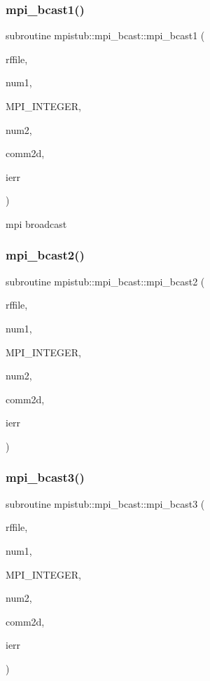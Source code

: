 \subsubsection{\texorpdfstring{mpi\_bcast1()}{mpi\_bcast1()}}
{\footnotesize\ttfamily subroutine mpistub\+::mpi\+\_\+bcast\+::mpi\+\_\+bcast1 (\begin{DoxyParamCaption}\item[{double precision, dimension(\+:)}]{rffile,  }\item[{}]{num1,  }\item[{}]{M\+P\+I\+\_\+\+I\+N\+T\+E\+G\+ER,  }\item[{}]{num2,  }\item[{integer}]{comm2d,  }\item[{}]{ierr }\end{DoxyParamCaption})}



mpi broadcast 

\mbox{\label{interfacempistub_1_1mpi__bcast_aaa0cc632dc25d1d3c5757c751024f9b2}} 
\subsubsection{\texorpdfstring{mpi\_bcast2()}{mpi\_bcast2()}}
{\footnotesize\ttfamily subroutine mpistub\+::mpi\+\_\+bcast\+::mpi\+\_\+bcast2 (\begin{DoxyParamCaption}\item[{double precision}]{rffile,  }\item[{}]{num1,  }\item[{}]{M\+P\+I\+\_\+\+I\+N\+T\+E\+G\+ER,  }\item[{}]{num2,  }\item[{integer}]{comm2d,  }\item[{}]{ierr }\end{DoxyParamCaption})}

\mbox{\label{interfacempistub_1_1mpi__bcast_af37e70cf2f9c41de612305131cd71d92}} 
\subsubsection{\texorpdfstring{mpi\_bcast3()}{mpi\_bcast3()}}
{\footnotesize\ttfamily subroutine mpistub\+::mpi\+\_\+bcast\+::mpi\+\_\+bcast3 (\begin{DoxyParamCaption}\item[{integer, dimension(\+:)}]{rffile,  }\item[{}]{num1,  }\item[{}]{M\+P\+I\+\_\+\+I\+N\+T\+E\+G\+ER,  }\item[{}]{num2,  }\item[{integer}]{comm2d,  }\item[{}]{ierr }\end{DoxyParamCaption})}

